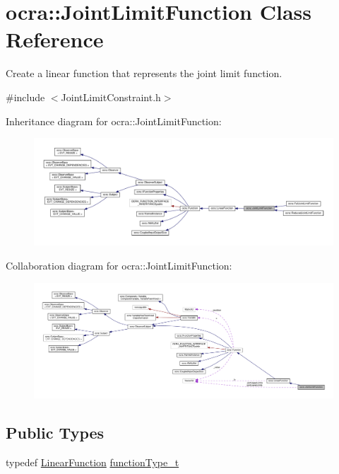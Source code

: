 \hypertarget{classocra_1_1JointLimitFunction}{}\section{ocra\+:\+:Joint\+Limit\+Function Class Reference}
\label{classocra_1_1JointLimitFunction}


Create a linear function that represents the joint limit function.  




{\ttfamily \#include $<$Joint\+Limit\+Constraint.\+h$>$}



Inheritance diagram for ocra\+:\+:Joint\+Limit\+Function\+:
\nopagebreak
\begin{figure}[H]
\begin{center}
\leavevmode
\includegraphics[width=350pt]{d9/dee/classocra_1_1JointLimitFunction__inherit__graph}
\end{center}
\end{figure}


Collaboration diagram for ocra\+:\+:Joint\+Limit\+Function\+:
\nopagebreak
\begin{figure}[H]
\begin{center}
\leavevmode
\includegraphics[width=350pt]{d9/dbd/classocra_1_1JointLimitFunction__coll__graph}
\end{center}
\end{figure}
\subsection*{Public Types}
\begin{DoxyCompactItemize}
\item 
typedef \hyperlink{classocra_1_1LinearFunction}{Linear\+Function} \hyperlink{classocra_1_1JointLimitFunction_af300f2c709840b94759c445130ec9a18}{function\+Type\+\_\+t}
\end{DoxyCompactItemize}
